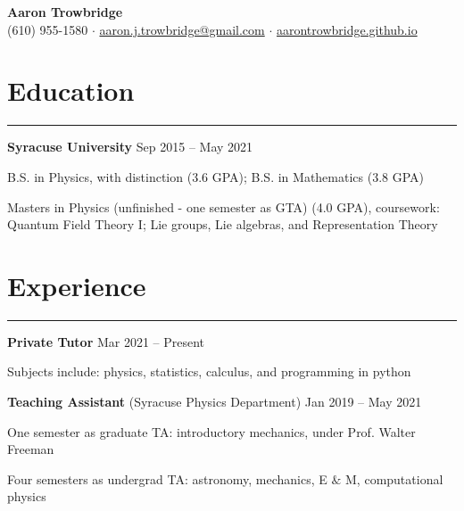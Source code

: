\documentclass{article}
\newcommand{\myline}{\rule[\baselineskip]{\linewidth}{1pt}}
\begin{document}
\begin{center}
\huge
\textbf{Aaron Trowbridge}\\

\normalsize
(610) 955-1580 $\cdot$ \href{mailto:aaron.j.trowbridge@gmail.com}{aaron.j.trowbridge@gmail.com} $\cdot$ \href{https://aarontrowbridge.github.io/}{aarontrowbridge.github.io} \\

\end{center}


\section{Education}

\myline


\large\textbf{Syracuse University} \hfill \small Sep 2015 -- May 2021

\normalsize
\begin{compactitem}
\setlength\itemsep{0em}
\item B.S. in Physics, with distinction (3.6 GPA); B.S. in Mathematics (3.8 GPA) 
\item Masters in Physics (unfinished - one semester as GTA) (4.0 GPA), coursework: \\ Quantum Field Theory I; Lie groups, Lie algebras, and Representation Theory      
\end{compactitem}


\section{Experience}

\myline

\large\textbf{Private Tutor} \hfill \small Mar 2021 -- Present
\normalsize

\begin{compactitem}
\item Subjects include: physics, statistics, calculus, and programming in python
\end{compactitem}

\vspace{2.5pt}
\large\textbf{Teaching Assistant} \normalsize (Syracuse Physics Department)
 \hfill \small Jan 2019 -- May 2021
\normalsize

\begin{compactitem}
\item One semester as graduate TA: introductory mechanics, under Prof. Walter Freeman
\item Four semesters as undergrad TA: astronomy, mechanics, E $\&$ M, computational physics  
\end{compactitem}
\end{document}
